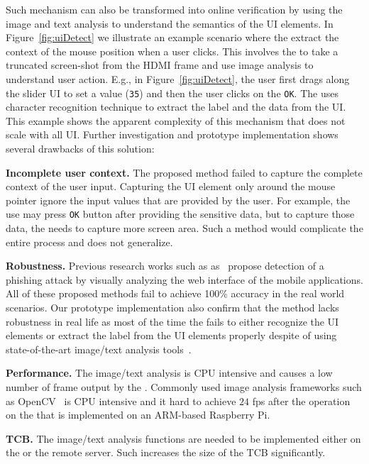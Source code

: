 Such \poa mechanism can also be transformed into online verification by using the image and text analysis to understand the semantics of the UI elements. In Figure~\ref{fig:uiDetect} we illustrate an example scenario where the \device extract the context of the mouse position when a user clicks. This involves the \device to take a truncated screen-shot from the HDMI frame and use image analysis to understand user action. E.g., in Figure~\ref{fig:uiDetect}, \one the user first drags along the slider UI to set a value (\texttt{35}) and then \two the user clicks on the \texttt{OK}. The \device uses character recognition technique to extract the label and the data from the UI. This example shows the apparent complexity of this mechanism that does not scale with all UI. Further investigation and prototype implementation shows several drawbacks of this solution:

\begin{mylist}
  \item \textbf{Incomplete user context.} The proposed method failed to capture the complete context of the user input. Capturing the UI element only around the mouse pointer ignore the input values that are provided by the user. For example, the use may press \texttt{OK} button after providing the sensitive data, but to capture those data, the \device needs to capture more screen area. Such a method would complicate the entire process and does not generalize.
  \item \textbf{Robustness.} Previous research works such as as~\cite{lukaSpoof,Chen:2010:DVS:1754393.1754394} propose detection of a phishing attack by visually analyzing the web interface of the mobile applications. All of these proposed methods fail to achieve 100\% accuracy in the real world scenarios. Our prototype implementation also confirm that the method lacks robustness in real life as most of the time the \device fails to either recognize the UI elements or extract the label from the UI elements properly despite of using state-of-the-art image/text analysis tools~\cite{opencv}.
  \item \textbf{Performance.} The image/text analysis is CPU intensive and causes a low number of frame output by the \device. Commonly used image analysis frameworks such as OpenCV~\cite{opencv} is CPU intensive and it hard to achieve $24$ fps after the operation on the \device that is implemented on an ARM-based Raspberry Pi.
  \item \textbf{TCB.} The image/text analysis functions are needed to be implemented either on the \device or the remote server. Such increases the size of the TCB significantly.
\end{mylist}


